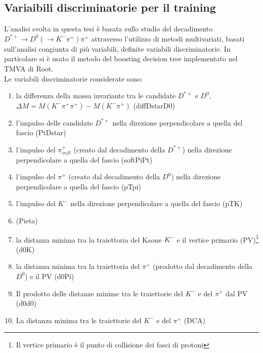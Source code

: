 \subsection{Variaibili discriminatorie per il training}
L'analisi svolta in questa tesi \`e basata sullo studio del decadimento $D^{*+} \rightarrow D^0( \rightarrow K^- \pi^+)  \pi^+ $ attraverso l'utilizzo di metodi multivariati, basati sull'analisi congiunta  di pi\`u variabili, definite variabili discriminatorie. In particolare si \`e usato il metodo del boosting decision tree implementato nel TMVA di Root. 
\\Le variabili discriminatorie considerate sono:
        \begin{enumerate}
            \item la differenza della massa invariante tra le candidate $D^{*+}$ e $D^0$, $\Delta M = M (K^-\pi^+\pi^+) - M(K^-\pi^+)$ (diffDstarD0)
            \item l'impulso delle candidate $D^{*+}$ nella direzione perpendicolare a quella del fascio (PtDstar)
            \item l'impulso del $\pi^+_{soft}$ (creato dal decadimento della $D^{*+}$) nella direzione perpendicolare a quella del fascio (softPiPt)
            \item l'impulso del $\pi^+$ (creato dal decadimento della $D^0$) nella direzione perpendicolare a quella del fascio (pTpi)
            \item l'impulso del $K^-$ nella direzione  perpendicolare a quella del fascio (pTK)
            \item (Pieta)
            \item la distanza minima tra la traiettoria del Kaone $K^-$ e il vertice primario (PV)\footnote{Il vertice primario è il punto di collisione dei fasci di protoni} (d0K)
            \item la distanza minima tra la traiettoria del $\pi^+$ (prodotto dal decadimento della $D^0$) e il PV (d0Pi)
            \item Il prodotto delle distanze minime tra le traiettorie del  $K^-$ e del $\pi^+$ dal PV (d0d0)
            \item La distanza minima tra le traiettorie del $K^-$ e del $\pi^+$ (DCA) %

\end{enumerate}
